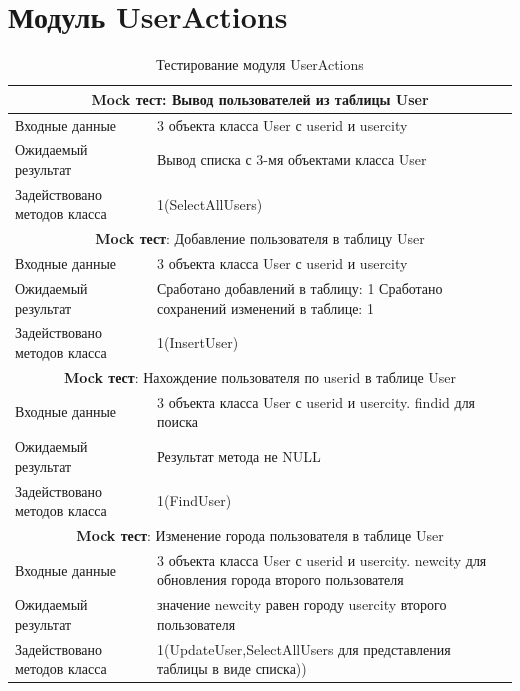 \newpage
\section{Модуль UserActions}
\begin{table} 
	\caption{\label{tab:maintable}Тестирование модуля UserActions}
	\begin{center}
		\begin{tabular}{|l|p{10cm}|}
			\hline
			\multicolumn{2}{|c|}{\textbf{Mock тест}: Вывод пользователей из таблицы User} \\
			\hline
			Входные данные & 3 объекта класса User с userid и usercity \\
			Ожидаемый результат &  Вывод списка с 3-мя объектами класса User \\
			Задействовано методов класса & 1(SelectAllUsers) \\
			\hline
			\multicolumn{2}{|c|}{\textbf{Mock тест}: Добавление пользователя в таблицу User} \\
			\hline
			Входные данные & 3 объекта класса User с userid и usercity\\
			Ожидаемый результат &   Сработано добавлений в таблицу: 1 Сработано сохранений изменений в таблице: 1 \\
			Задействовано методов класса & 1(InsertUser)\\
			\hline
			\multicolumn{2}{|c|}{\textbf{Mock тест}: Нахождение пользователя по userid в таблице User} \\
			\hline
			Входные данные & 3 объекта класса User с userid и usercity. findid для поиска\\
			Ожидаемый результат & Результат метода не NULL \\
			Задействовано методов класса & 1(FindUser)\\
			\hline
			
			\multicolumn{2}{|c|}{\textbf{Mock тест}: Изменение  города пользователя в таблице User} \\
			\hline
			Входные данные & 3 объекта класса User с userid и usercity. newcity для обновления города второго пользователя\\
			Ожидаемый результат &  значение newcity равен городу usercity второго пользователя\\
			Задействовано методов класса & 1(UpdateUser,SelectAllUsers для представления таблицы в виде списка))\\
			\hline
		\end{tabular}
	\end{center}
\end{table} 

